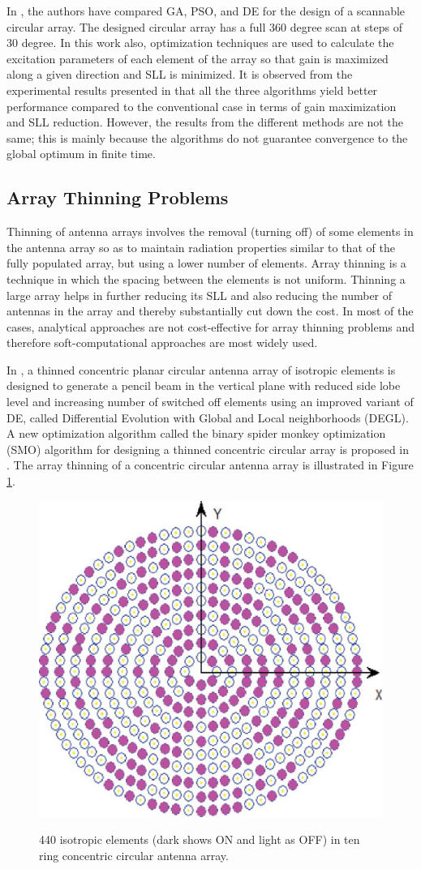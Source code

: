 In \cite{compCAD4Arry}, the authors have compared GA, PSO, and DE for the design of a scannable circular array. The designed circular array has a full 360 degree scan at steps of 30 degree. In this work also, optimization techniques are used to calculate the excitation parameters of each element of the array so that gain is maximized along a given direction and SLL is minimized. It is observed from the experimental results presented in \cite{compCAD4Arry} that all the three algorithms yield better performance compared to the conventional case in terms of gain maximization and SLL reduction. However, the results from the different methods are not the same; this is mainly because the algorithms do not guarantee convergence to the global optimum in finite time.

\subsection{Array Thinning Problems}
Thinning of antenna arrays involves the removal (turning off) of some elements in the antenna array so as to maintain radiation properties similar to that of the fully populated array, but using a lower number of elements. Array thinning is a technique in which the spacing between the elements is not uniform. Thinning a large array helps in further reducing its SLL and also reducing the number of antennas in the array and thereby substantially cut down the cost. In most of the cases, analytical approaches are not cost-effective for array thinning problems and therefore soft-computational approaches are most widely used.

In \cite{arrayThin1}, a thinned concentric planar circular antenna array of isotropic elements is designed to generate a pencil beam in the vertical plane with reduced side lobe level and increasing number of switched off elements using an improved variant of DE, called Differential Evolution with Global and Local neighborhoods (DEGL). A new optimization algorithm called the binary spider monkey optimization (SMO) algorithm for designing a thinned concentric circular array is proposed in \cite{arrayThin2}. The array thinning of a concentric circular antenna array is illustrated in Figure \ref{fig_2_4}.

\begin{figure}
  \centering
  \includegraphics[width=0.35\linewidth]{fig_2_4.eps}\\
  \caption{440 isotropic elements (dark shows ON and light as OFF) in ten ring concentric circular antenna array. \cite{arrayThin2}} \label{fig_2_4}
\end{figure}

